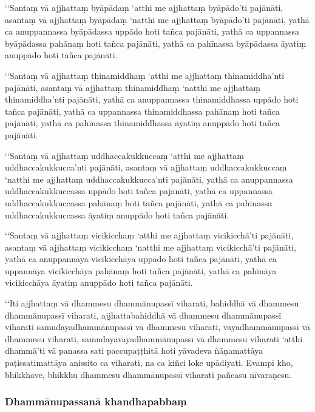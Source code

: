 ‘‘Santaṃ vā ajjhattaṃ byāpādaṃ ‘atthi me ajjhattaṃ byāpādo’ti pajānāti, asantaṃ vā ajjhattaṃ byāpādaṃ ‘natthi me ajjhattaṃ byāpādo’ti pajānāti, yathā ca anuppannassa byāpādassa uppādo hoti tañca pajānāti, yathā ca uppannassa byāpādassa pahānaṃ hoti tañca pajānāti, yathā ca pahīnassa byāpādassa āyatiṃ anuppādo hoti tañca pajānāti.

‘‘Santaṃ vā ajjhattaṃ thinamiddhaṃ ‘atthi me ajjhattaṃ thinamiddha’nti pajānāti, asantaṃ vā ajjhattaṃ thinamiddhaṃ ‘natthi me ajjhattaṃ thinamiddha’nti pajānāti, yathā ca anuppannassa thinamiddhassa uppādo hoti tañca pajānāti, yathā ca uppannassa thinamiddhassa pahānaṃ hoti tañca pajānāti, yathā ca pahīnassa thinamiddhassa āyatiṃ anuppādo hoti tañca pajānāti.

‘‘Santaṃ vā ajjhattaṃ uddhaccakukkuccaṃ ‘atthi me ajjhattaṃ uddhaccakukkucca’nti pajānāti, asantaṃ vā ajjhattaṃ uddhaccakukkuccaṃ ‘natthi me ajjhattaṃ uddhaccakukkucca’nti pajānāti, yathā ca anuppannassa uddhaccakukkuccassa uppādo hoti tañca pajānāti, yathā ca uppannassa uddhaccakukkuccassa pahānaṃ hoti tañca pajānāti, yathā ca pahīnassa uddhaccakukkuccassa āyatiṃ anuppādo hoti tañca pajānāti.

‘‘Santaṃ vā ajjhattaṃ vicikicchaṃ ‘atthi me ajjhattaṃ vicikicchā’ti pajānāti, asantaṃ vā ajjhattaṃ vicikicchaṃ ‘natthi me ajjhattaṃ vicikicchā’ti pajānāti, yathā ca anuppannāya vicikicchāya uppādo hoti tañca pajānāti, yathā ca uppannāya vicikicchāya pahānaṃ hoti tañca pajānāti, yathā ca pahīnāya vicikicchāya āyatiṃ anuppādo hoti tañca pajānāti.

‘‘Iti ajjhattaṃ vā dhammesu dhammānupassī viharati, bahiddhā vā dhammesu dhammānupassī viharati, ajjhattabahiddhā vā dhammesu dhammānupassī viharati samudayadhammānupassī vā dhammesu viharati, vayadhammānupassī vā dhammesu viharati, samudayavayadhammānupassī vā dhammesu viharati ‘atthi dhammā’ti vā panassa sati paccupaṭṭhitā hoti yāvadeva ñāṇamattāya paṭissatimattāya anissito ca viharati, na ca kiñci loke upādiyati. Evampi kho, bhikkhave, bhikkhu dhammesu dhammānupassī viharati pañcasu nīvaraṇesu.


\subsubsection{Dhammānupassanā khandhapabbaṃ}

